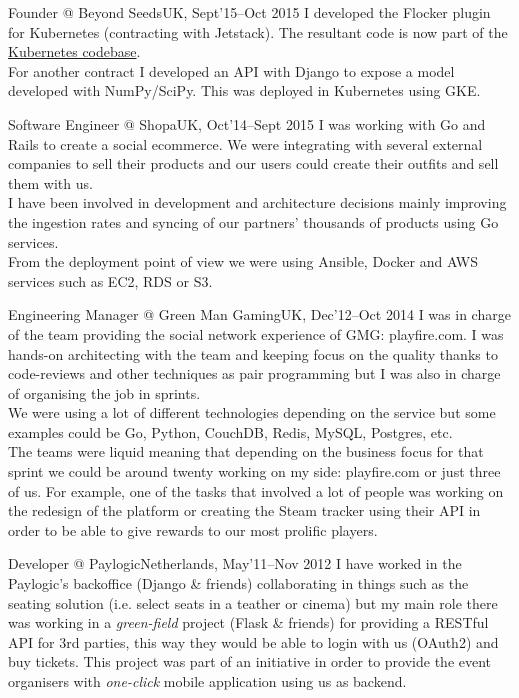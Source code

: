 \documentclass[11pt, a4paper, sans]{moderncv}
\begin{document}
\cventry{}{}
{Founder @ Beyond Seeds}{UK, Sept'15--Oct 2015}
{}
{\vspace{-1em}I developed the Flocker plugin for Kubernetes (contracting with Jetstack). The resultant code is now part of the \href{https://github.com/kubernetes/kubernetes/pull/14328}{Kubernetes codebase}.\\
For another contract I developed an API with Django to expose a model developed with NumPy/SciPy. This was deployed in Kubernetes using GKE.\\}

\cventry{}{}
{Software Engineer @ Shopa}{UK, Oct'14--Sept 2015}
{}
{\vspace{-1em}I was working with Go and Rails to create a social ecommerce. We were integrating with several external companies to sell their products and our users could create their outfits and sell them with us.\\
I have been involved in development and architecture decisions mainly improving the ingestion rates and syncing of our partners' thousands of products using Go services.\\
From the deployment point of view we were using Ansible, Docker and AWS services such as EC2, RDS or S3.\\}

\cventry{}{}
{Engineering Manager @ Green Man Gaming}{UK, Dec'12--Oct 2014}
{}
{\vspace{-1em}I was in charge of the team providing the social network experience of GMG: playfire.com. I was hands-on architecting with the team and keeping focus on the quality thanks to code-reviews and other techniques as pair programming but I was also in charge of organising the job in sprints.\\
We were using a lot of different technologies depending on the service but some examples could be Go, Python, CouchDB, Redis, MySQL, Postgres, etc.\\
The teams were liquid meaning that depending on the business focus for that sprint we could be around twenty working on my side: playfire.com or just three of us. For example, one of the tasks that involved a lot of people was working on the redesign of the platform or creating the Steam tracker using their API in order to be able to give rewards to our most prolific players.\\}

\cventry{}{}
{Developer @ Paylogic}{Netherlands, May'11--Nov 2012}
{}
{\vspace{-1em}I have worked in the Paylogic's backoffice (Django \& friends) collaborating in things such as the seating solution (i.e. select seats in a teather or cinema) but my main role there was working in a \textit{green-field} project (Flask \& friends) for providing a RESTful API for 3rd parties, this way they would be able to login with us (OAuth2) and buy tickets. This project was part of an initiative in order to provide the event organisers with \textit{one-click} mobile application using us as backend.\\}
\end{document}
